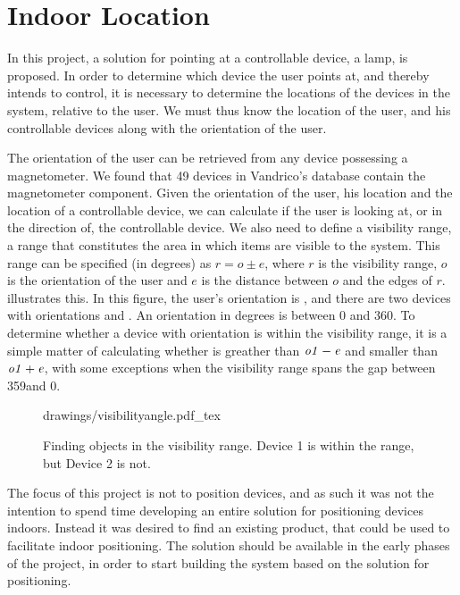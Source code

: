 \section{Indoor Location}\label{sec:designindoorlocation}
In this project, a solution for pointing at a controllable device, \eg a lamp, is proposed. 
In order to determine which device the user points at, 
and thereby intends to control, 
it is necessary to determine the locations of the devices in the system, 
relative to the user. 
We must thus know the location of the user, 
and his controllable devices along with the orientation of the user.

The orientation of the user can be retrieved from any device possessing a magnetometer. 
We found that 49 devices in Vandrico's database contain the magnetometer component. 
Given the orientation of the user, his location and the location of a controllable device, 
we can calculate if the user is looking at, 
or in the direction of, the controllable device.
We also need to define a visibility range, \ie a range that constitutes the area in which items are visible to the system. This range can be specified (in degrees) as $r = o \pm e$, where $r$ is the visibility range, $o$ is the orientation of the user and $e$ is the distance between $o$ and the edges of $r$.
 illustrates this. 
In this figure, the user's orientation is , 
and there are two devices with orientations  and . 
An orientation in degrees is between \num{0} and \num{360}. 
To determine whether a device with orientation  is within the visibility range, 
it is a simple matter of calculating whether  is greather than $\var{o1}-\var{e}$ and smaller than $\var{o1}+\var{e}$, with some exceptions when the visibility range spans the gap between 359\degree and 0\degree.

\begin{figure}[!htb]
    \centering
    \def\svgwidth{0.6\textwidth}
    {drawings/visibilityangle.pdf_tex}
    \caption{Finding objects in the visibility range. Device 1 is within the range, but Device 2 is not.}
\label{fig:visibilityangle}
\end{figure}

The focus of this project is not to position devices, 
and as such it was not the intention to spend time developing an entire solution for positioning devices indoors. 
Instead it was desired to find an existing product, 
that could be used to facilitate indoor positioning.
The solution should be available in the early phases of the project, 
in order to start building the system based on the solution for positioning.

